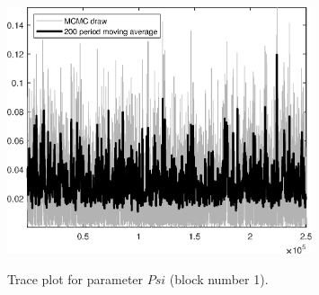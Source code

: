 \begin{figure}[H]
\centering
  \includegraphics[width=0.8\textwidth]{directed_search_est_alt_obs/graphs/TracePlot_Psi_blck_1}\\
    \caption{Trace plot for parameter $Psi$ (block number 1).}
\end{figure}
